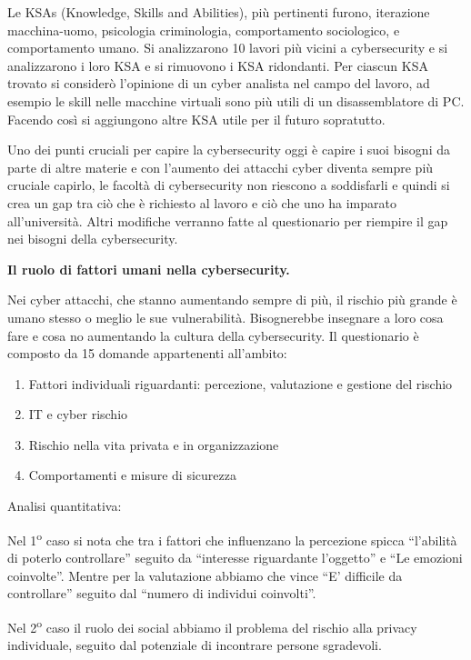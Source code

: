 \documentclass[a4page, 11pt, twocolumn]{article}
\begin{document}
Le KSAs (Knowledge, Skills and Abilities), più pertinenti furono,
iterazione macchina-uomo, psicologia criminologia, comportamento
sociologico, e comportamento umano. Si analizzarono 10 lavori più vicini
a cybersecurity e si analizzarono i loro KSA e si rimuovono i KSA
ridondanti. Per ciascun KSA trovato si considerò l'opinione di un cyber
analista nel campo del lavoro, ad esempio le skill nelle macchine
virtuali sono più utili di un disassemblatore di PC. Facendo così si
aggiungono altre KSA utile per il futuro sopratutto.

Uno dei punti cruciali per capire la cybersecurity oggi è capire i suoi
bisogni da parte di altre materie e con l'aumento dei attacchi cyber
diventa sempre più cruciale capirlo, le facoltà di cybersecurity non
riescono a soddisfarli e quindi si crea un gap tra ciò che è richiesto
al lavoro e ciò che uno ha imparato all'università. Altri modifiche
verranno fatte al questionario per riempire il gap nei bisogni della
cybersecurity.

\textbf{Il ruolo di fattori umani nella cybersecurity.}

Nei cyber attacchi, che stanno aumentando sempre di più, il rischio più
grande è umano stesso o meglio le sue vulnerabilità. Bisognerebbe
insegnare a loro cosa fare e cosa no aumentando la cultura della
cybersecurity. Il questionario è composto da 15 domande appartenenti
all'ambito:

\begin{enumerate}
	\item
	Fattori individuali riguardanti: percezione, valutazione e gestione
	del rischio
	\item
	IT e cyber rischio
	\item
	Rischio nella vita privata e in organizzazione
	\item
	Comportamenti e misure di sicurezza
\end{enumerate}

Analisi quantitativa:

Nel 1\textsuperscript{o} caso si nota che tra i fattori che influenzano
la percezione spicca ``l'abilità di poterlo controllare'' seguito da
``interesse riguardante l'oggetto'' e ``Le emozioni coinvolte''. Mentre
per la valutazione abbiamo che vince ``E' difficile da controllare''
seguito dal ``numero di individui coinvolti''.

Nel 2\textsuperscript{o} caso il ruolo dei social abbiamo il problema
del rischio alla privacy individuale, seguito dal potenziale di
incontrare persone sgradevoli.
\end{document}
